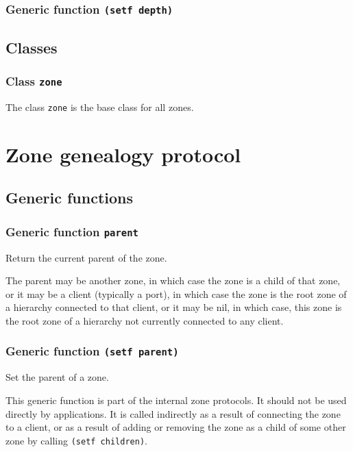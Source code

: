 \documentclass{report}
\begin{document}
\subsubsection{Generic function \texttt{(setf depth)}}

\subsection{Classes}

\subsubsection{Class \texttt{zone}}

The class \texttt{zone} is the base class for all zones. 


\section{Zone genealogy protocol}

\subsection{Generic functions}

\subsubsection{Generic function \texttt{parent}}

Return the current parent of the zone. 

The parent may be another zone, in which case the zone is a child of
that zone, or it may be a client (typically a port), in which case the
zone is the root zone of a hierarchy connected to that client, or it
may be nil, in which case, this zone is the root zone of a hierarchy
not currently connected to any client.

\subsubsection{Generic function \texttt{(setf parent)}}

Set the parent of a zone.

This generic function is part of the internal zone protocols.  It
should not be used directly by applications.  It is called indirectly
as a result of connecting the zone to a client, or as a result of
adding or removing the zone as a child of some other zone by calling
\texttt{(setf children)}.
\end{document}
